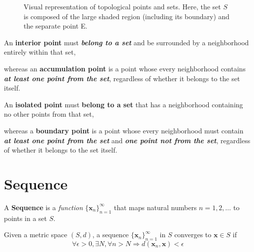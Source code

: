 \begin{figure}[h!]
    \caption{Visual representation of topological points and sets. Here, the set $S$ is composed of the large shaded region (including its boundary) and the separate point E.}
    \label{fig:topology}
\end{figure}

\begin{remark*}
    An \textbf{interior point} must \textit{\textbf{belong to a set}} and be surrounded by a neighborhood entirely within that set,

    whereas an \textbf{accumulation point} is a point whose every neighborhood contains \textit{\textbf{at least one point from the set}}, regardless of whether it belongs to the set itself.
\end{remark*}

\begin{remark*}
    An \textbf{isolated point} must \textbf{belong to a set} that has a neighborhood containing no other points from that set,

    whereas a \textbf{boundary point} is a point whose every neighborhood must contain \textit{\textbf{at least one point from the set}} and \textit{\textbf{one point not from the set}}, regardless of whether it belongs to the set itself.
\end{remark*}

\section{Sequence}

\begin{definition}[Sequence]
    A \textbf{Sequence} is a \textit{function} $\{{\mathbf{x}_n}\}_{n=1}^{\infty}$ that maps natural numbers $n = 1,2,\dots$ to points in a set $S$.
\end{definition}

\begin{definition}[Converge]
    Given a metric space $(S,d)$, a sequence $\{{\mathbf{x}_n}\}_{n=1}^{\infty}$ in $S$ converges to $\mathbf{x} \in  S$ if \begin{equation*}
        \forall \epsilon >0, \exists N, \forall n > N \Rightarrow d(\mathbf{x}_n,\mathbf{x}) < \epsilon
    \end{equation*}
\end{definition}

